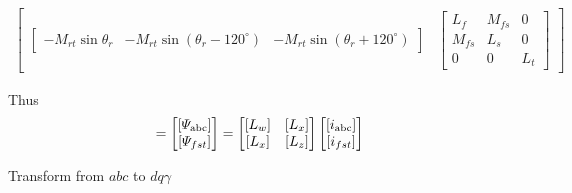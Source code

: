 \documentclass[a4paper,numbers=noenddot,12pt]{scrbook}
\begin{document}
\begin{sideways}
{\begin{multline}
\begin{bmatrix}
\begin{bmatrix}
                        - M_{rt} \sin \theta_r & - M_{rt} \sin (\theta_r - 120^{\circ}) & - M_{rt} \sin(\theta_r + 120^{\circ})
                    \end{bmatrix} &
                    \begin{bmatrix}
                        L_f & M_{fs} & 0 \\
                        M_{fs} & L_s & 0 \\
                        0 & 0 & L_t
                    \end{bmatrix}
                \end{bmatrix}
                \label{eq:Eq8.22}
            \end{multline}}
        \end{sideways}
        \normalsize
        \newpage

        Thus
        \begin{equation}
            [\varPsi_{\textup{abc}fst}] = 
            \begin{bmatrix}
                [\varPsi_{\textup{abc}}] \\
                [\varPsi_{fst}]
            \end{bmatrix}
            =
            \begin{bmatrix}
                [L_w] & [L_x] \\
                [L_x] & [L_z]
            \end{bmatrix}
            \begin{bmatrix}
                [i_{\textup{abc}}] \\
                [i_{fst}]
            \end{bmatrix}
            \label{eq:Eq8.23}
        \end{equation}

        Transform from $abc$ to $dq\gamma$

        
\end{document}
